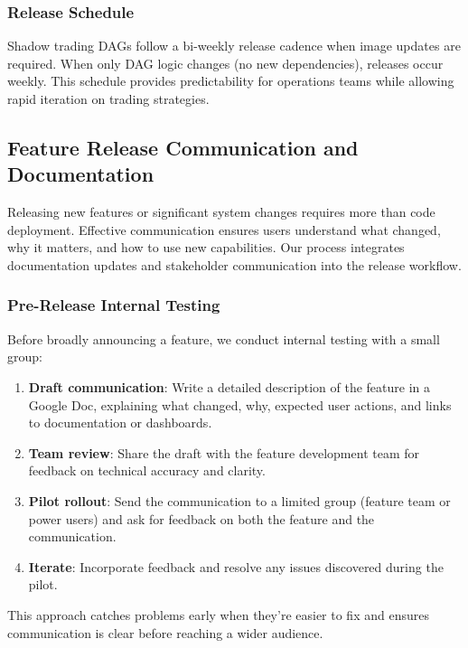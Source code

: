 \subsubsection{Release Schedule}
Shadow trading DAGs follow a bi-weekly release cadence when image updates
are required. When only DAG logic changes (no new dependencies), releases
occur weekly. This schedule provides predictability for operations
teams while allowing rapid iteration on trading strategies.

\subsection{Feature Release Communication and Documentation}
Releasing new features or significant system changes requires more than
code deployment. Effective communication ensures users understand what
changed, why it matters, and how to use new capabilities. Our process integrates
documentation updates and stakeholder communication into the release workflow.

\subsubsection{Pre-Release Internal Testing}
Before broadly announcing a feature, we conduct internal testing with a
small group:
\begin{enumerate}
  \item \textbf{Draft communication}: Write a detailed description of the
    feature in a Google Doc, explaining what changed, why, expected
    user actions, and links to documentation or dashboards.

  \item \textbf{Team review}: Share the draft with the feature development
    team for feedback on technical accuracy and clarity.

  \item \textbf{Pilot rollout}: Send the communication to a limited group
    (feature team or power users) and ask for feedback on both the feature
    and the communication.

  \item \textbf{Iterate}: Incorporate feedback and resolve any issues discovered
    during the pilot.
\end{enumerate}
This approach catches problems early when they're easier to fix and
ensures communication is clear before reaching a wider audience.
